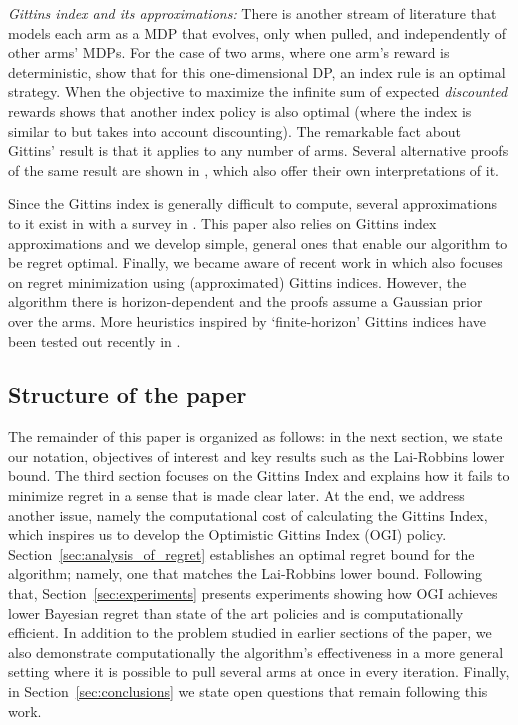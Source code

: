 \noindent\emph{Gittins index and its approximations: }
There is another stream of literature that models each arm as a MDP that evolves, only when pulled,  and independently of other arms' MDPs. For the case of two arms, where one arm's reward is deterministic, \cite{bradt1956sequential} show that for this one-dimensional DP, an index rule is an optimal strategy. When the objective to maximize the infinite sum of expected \emph{discounted} rewards \cite{gittins1979bandit} shows that another index policy is also optimal (where the index is similar to \cite{bradt1956sequential} but takes into account discounting). The remarkable fact about Gittins' result is that it applies to any number of arms. Several alternative proofs of the same result are shown in \cite{tsitsiklis1994short,weber1992gittins,whittle1980multi,bertsimas1996conservation}, which also offer their own interpretations of it. 
 
Since the Gittins index is generally difficult to compute, several approximations to it exist in \cite{yao2006some,katehakis1987multi,varaiya1985extensions} with a survey in \cite{chakravorty2013multi}. This paper also relies on Gittins index approximations and we develop simple, general ones that enable our algorithm to be regret optimal. Finally, we became aware of recent work in \cite{lattimore2016bayesregret} which also focuses on regret minimization using (approximated) Gittins indices. However, the algorithm there is horizon-dependent and the proofs assume a Gaussian prior over the arms. More heuristics inspired by `finite-horizon' Gittins indices have been tested out recently in \cite{kaufmann2016bayesian}.

\subsection{Structure of the paper}
The remainder of this paper is organized as follows: in the next section, we state our notation, objectives of interest 
and key results such as the Lai-Robbins lower bound. The third section focuses on the Gittins Index and explains how it fails to minimize regret in a sense that is made clear later. At the end, we address another issue, namely the computational cost of calculating the Gittins Index, which inspires us to develop the Optimistic Gittins Index (OGI) policy. Section~\ref{sec:analysis_of_regret} establishes an optimal regret bound for the algorithm; namely, one that matches the Lai-Robbins lower bound. Following that, Section~\ref{sec:experiments} presents experiments showing how OGI achieves lower Bayesian regret than state of the art policies and is computationally efficient. In addition to the problem studied in earlier sections of the paper, we also demonstrate computationally the algorithm's effectiveness in a more general setting where it is possible to pull several arms at once in every iteration. Finally, in Section~\ref{sec:conclusions} we state open questions that remain following this work.